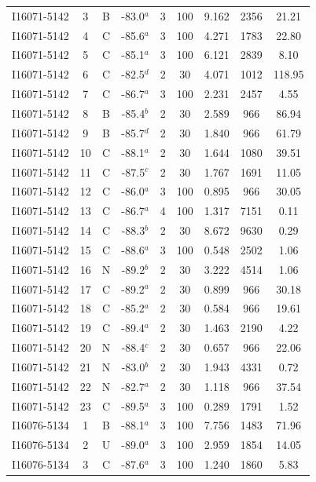\begin{table}
\begin{tabular}{ccccccccc}
I16071-5142 & 3 & B & -83.0$^{a}$ & 3 & 100 & 9.162 & 2356 & 21.21 \\
I16071-5142 & 4 & C & -85.6$^{a}$ & 3 & 100 & 4.271 & 1783 & 22.80 \\
I16071-5142 & 5 & C & -85.1$^{a}$ & 3 & 100 & 6.121 & 2839 & 8.10 \\
I16071-5142 & 6 & C & -82.5$^{d}$ & 2 & 30 & 4.071 & 1012 & 118.95 \\
I16071-5142 & 7 & C & -86.7$^{a}$ & 3 & 100 & 2.231 & 2457 & 4.55 \\
I16071-5142 & 8 & B & -85.4$^{b}$ & 2 & 30 & 2.589 & 966 & 86.94 \\
I16071-5142 & 9 & B & -85.7$^{d}$ & 2 & 30 & 1.840 & 966 & 61.79 \\
I16071-5142 & 10 & C & -88.1$^{a}$ & 2 & 30 & 1.644 & 1080 & 39.51 \\
I16071-5142 & 11 & C & -87.5$^{c}$ & 2 & 30 & 1.767 & 1691 & 11.05 \\
I16071-5142 & 12 & C & -86.0$^{a}$ & 3 & 100 & 0.895 & 966 & 30.05 \\
I16071-5142 & 13 & C & -86.7$^{a}$ & 4 & 100 & 1.317 & 7151 & 0.11 \\
I16071-5142 & 14 & C & -88.3$^{b}$ & 2 & 30 & 8.672 & 9630 & 0.29 \\
I16071-5142 & 15 & C & -88.6$^{a}$ & 3 & 100 & 0.548 & 2502 & 1.06 \\
I16071-5142 & 16 & N & -89.2$^{b}$ & 2 & 30 & 3.222 & 4514 & 1.06 \\
I16071-5142 & 17 & C & -89.2$^{a}$ & 2 & 30 & 0.899 & 966 & 30.18 \\
I16071-5142 & 18 & C & -85.2$^{a}$ & 2 & 30 & 0.584 & 966 & 19.61 \\
I16071-5142 & 19 & C & -89.4$^{a}$ & 2 & 30 & 1.463 & 2190 & 4.22 \\
I16071-5142 & 20 & N & -88.4$^{c}$ & 2 & 30 & 0.657 & 966 & 22.06 \\
I16071-5142 & 21 & N & -83.0$^{b}$ & 2 & 30 & 1.943 & 4331 & 0.72 \\
I16071-5142 & 22 & N & -82.7$^{a}$ & 2 & 30 & 1.118 & 966 & 37.54 \\
I16071-5142 & 23 & C & -89.5$^{a}$ & 3 & 100 & 0.289 & 1791 & 1.52 \\
I16076-5134 & 1 & B & -88.1$^{a}$ & 3 & 100 & 7.756 & 1483 & 71.96 \\
I16076-5134 & 2 & U & -89.0$^{a}$ & 3 & 100 & 2.959 & 1854 & 14.05 \\
I16076-5134 & 3 & C & -87.6$^{a}$ & 3 & 100 & 1.240 & 1860 & 5.83 \\

\end{tabular}
\end{table}
